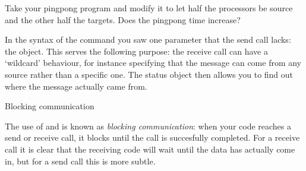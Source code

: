 \begin{exercise}
  \label{ex:hbwpingpong}
  Take your pingpong program and modify it 
  to let half the processors
  be source and the other half the targets. Does the pingpong time increase?
\end{exercise}

In the syntax of the  command you saw one parameter that
the send call lacks: the  object. This serves the following
purpose: the receive call can have a `wildcard' behaviour, for instance specifying
that the message can come from any source rather than a specific one. The status
object then allows you to find out where the message actually came from.

 {Blocking communication}

The use of  and 
is known as \emph{blocking communication}: when your code reaches a
send or receive call, it blocks until the call is succesfully completed.
For a receive call it is clear that the receiving code will wait until
the data has actually come in, but for a send call this is more subtle.

